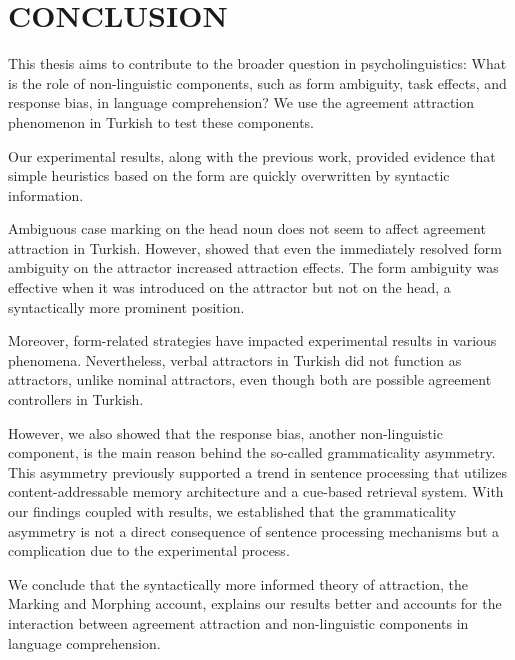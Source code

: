 









\chapter{CONCLUSION} \label{ch:conclusion}

This thesis aims to contribute to the broader question in psycholinguistics: What is the role of non-linguistic components, such as form ambiguity, task effects, and response bias, in language comprehension? We use the agreement attraction phenomenon in Turkish to test these components.

Our experimental results, along with the previous work, provided evidence that simple heuristics based on the form are quickly overwritten by syntactic information.

Ambiguous case marking on the head noun does not seem to affect agreement attraction in Turkish. However, \citet{Slioussar2018} showed that even the immediately resolved form ambiguity on the attractor increased attraction effects. The form ambiguity was effective when it was introduced on the attractor but not on the head, a syntactically more prominent position. 

Moreover, form-related strategies have impacted experimental results in various phenomena. Nevertheless, verbal attractors in Turkish did not function as attractors, unlike nominal attractors, even though both are possible agreement controllers in Turkish. 

However, we also showed that the response bias, another non-linguistic component, is the main reason behind the so-called grammaticality asymmetry. This asymmetry previously supported a trend in sentence processing that utilizes content-addressable memory architecture and a cue-based retrieval system. With our findings coupled with \cites{HammerlyEtAl2019} results, we established that the grammaticality asymmetry is not a direct consequence of sentence processing mechanisms but a complication due to the experimental process.

We conclude that the syntactically more informed theory of attraction, the Marking and Morphing account, explains our results better and accounts for the interaction between agreement attraction and non-linguistic components in language comprehension.


